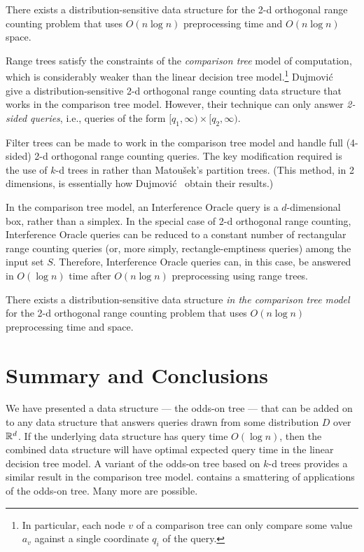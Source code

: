 \documentclass{patmorin}
\begin{document}
\begin{thm}
  There exists a distribution-sensitive data structure for the 2-d
  orthogonal range counting problem that uses $O(n\log n)$ preprocessing
  time and $O(n\log n)$ space.
\end{thm}

Range trees satisfy the constraints of the \emph{comparison tree} model of
computation, which is considerably weaker than the linear decision tree
model.\footnote{In particular, each node $v$ of a comparison tree can
only compare some value $a_v$ against a single coordinate $q_i$ of the
query.} Dujmovi\'c \etal\ \cite{dhm09} give a distribution-sensitive 2-d
orthogonal range counting data structure that works in the comparison
tree model.  However, their technique can only answer \emph{2-sided
queries}, i.e., queries of the form $[q_1,\infty)\times[q_2,\infty)$.

Filter trees can be made to work in the comparison tree model
and handle full (4-sided) 2-d orthogonal range counting queries.
The key modification required is the use of $k$-d trees in
 rather than Matou\v{s}ek's partition
trees. (This method, in 2 dimensions, is essentially how Dujmovi\'c \etal\
obtain their results.)

In the comparison tree model, an Interference Oracle query is a
$d$-dimensional box, rather than a simplex. In the special case of
2-d orthogonal range counting, Interference Oracle queries can be
reduced to a constant number of rectangular range counting queries
(or, more simply, rectangle-emptiness queries) among the input set $S$.
Therefore, Interference Oracle queries can, in this case, be answered in
$O(\log n)$ time after $O(n\log n)$ preprocessing using range trees.

\begin{thm}
  There exists a distribution-sensitive data structure \emph{in the
  comparison tree model} for the 2-d orthogonal range counting problem
  that uses $O(n\log n)$ preprocessing time and space.
\end{thm}

\section{Summary and Conclusions}

We have presented a data structure --- the odds-on tree --- that can
be added on to any data structure that answers queries drawn from some
distribution $D$ over $\mathbb{R}^d$.  If the underlying data structure has query
time $O(\log n)$, then the combined data structure will have optimal
expected query time in the linear decision tree model.  A variant of
the odds-on tree based on $k$-d trees provides a similar result in the
comparison tree model.  \secref{applications} contains a smattering of
applications of the odds-on tree.  Many more are possible.
\end{document}
